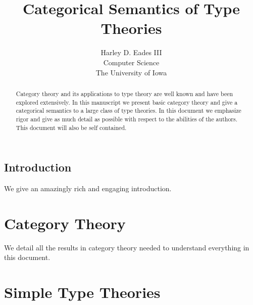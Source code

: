 \documentclass{report}
\begin{document}

\newtheorem{thm}{Theorem}
\newtheorem{lemma}[thm]{Lemma}

\newtheorem{corollary}[thm]{Corollary}
\newtheorem{definition}[thm]{Definition}
\newtheorem{remark}[thm]{Remark}
\newtheorem{proposition}[thm]{Proposition}
\newtheorem{notn}[thm]{Notation}
\newtheorem{observation}[thm]{Observation}

\newcommand{\interp}[1]{[\negthinspace[#1]\negthinspace]}
\newcommand{\normto}[0]{\rightsquigarrow^{!}}
\newcommand{\case}[4]{\text{case}\ #1\ \text{of}\ #2\text{.}#3\text{,}#2\text{.}#4}
\newcommand{\join}[0]{\downarrow}

\title{Categorical Semantics of Type Theories}
\author{Harley D. Eades III \\
Computer Science\\
The University of Iowa}

\maketitle

\begin{abstract}
  Category theory and its applications to type theory are well known and 
  have been explored extensively.  In this manuscript we present basic category
  theory and give a categorical semantics to a large class of type theories.
  In this document we emphasize rigor and give as much detail as possible
  with respect to the abilities of the authors.  This document will also be
  self contained.
\end{abstract}

\tableofcontents

\listoffigures

\section{Introduction}
\label{sec:introduction}
We give an amazingly rich and engaging introduction.

\chapter{Category Theory}
\label{chap:cat_theory}

We detail all the results in category theory needed to understand everything in this
document.

\chapter{Simple Type Theories}
\label{chap:simple_types}



\end{document}
